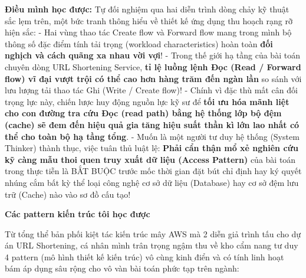 \textbf{Điều mình học được:} Tự đối nghiệm qua hai diễn trình dòng chảy
kỹ thuật sắc lẹm trên, một bức tranh thông hiểu về thiết kế ứng dụng thu
hoạch rạng rỡ hiện sắc: - Hai vùng thao tác Create flow và Forward flow
mang trong mình bộ thông số đặc điểm tính tải trọng (workload
characteristics) hoàn toàn \textbf{đối nghịch và cách quãng xa nhau vời
vợi}! - Trong thế giới hạ tầng của bài toán chuyên dòng URL Shortening
Service, \textbf{tỉ lệ luồng lệnh Đọc (Read / Forward flow) vĩ đại vượt
trội có thể cao hơn hàng trăm đến ngàn lần} so sánh với lưu lượng tải
thao tác Ghi (Write / Create flow)! - Chính vì đặc thù mất cân đối trọng
lực này, chiến lược huy động nguồn lực kỹ sư để \textbf{tối ưu hóa mãnh
liệt cho con đường tra cứu Đọc (read path) bằng hệ thống lớp bộ đệm
(cache) sẽ đem đến hiệu quả gia tăng hiệu suất thần kì lớn lao nhất có
thể cho toàn bộ hạ tầng tổng}. - Muốn là một người tư duy hệ thống
(System Thinker) thành thục, việc tuân thủ luật lệ: \textbf{Phải cẩn
thận mổ xẻ nghiên cứu kỹ càng mẫu thoi quen truy xuất dữ liệu (Access
Pattern)} của bài toán trong thực tiễn là BẮT BUỘC trước mốc thời gian
đặt bút chỉ định hay ký quyết nhúng cắm bất kỳ thể loại công nghệ cơ sở
dữ liệu (Database) hay cơ sở đệm lưu trữ (Cache) nào vào sơ đồ cấu tạo!

\vspace{0.5em}\noindent\textbf{Các pattern kiến trúc tôi học
được}\par

Từ tổng thể bản phối kiệt tác kiến trúc mây AWS mà 2 diễn giả trình tấu
cho dự án URL Shortening, cá nhân mình trân trọng ngậm thu về kho cẩm
nang tư duy 4 pattern (mô hình thiết kế kiến trúc) vô cùng kinh điển và
có tính linh hoạt bám áp dụng sâu rộng cho vô vàn bài toán phức tạp trên
ngành:

